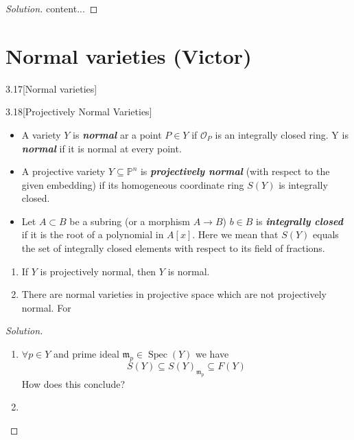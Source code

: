 \begin{proof}[Solution]
	content...
\end{proof}

\section{Normal varieties (Victor)}

\begin{manualexercise}{3.17}[Normal varieties]
	\end{manualexercise}

\begin{manualexercise}{3.18}[Projectively Normal Varieties]
\end{manualexercise}

	\begin{defn}\leavevmode 
		\begin{itemize}
		\item A variety $Y$ is \textit{\textbf{normal}} ar a point $P\in Y$ if $\mathcal{O}_{P}$ is an integrally closed ring. Y is \textit{\textbf{normal}} if it is normal at every point.
		\item A projective variety $Y\subseteq \mathbb{P}^n$ is \textit{\textbf{projectively normal}} (with respect to the given embedding) if its homogeneous coordinate ring $S(Y)$ is integrally closed.

		\item 	Let $A\subset B$ be a subring (or a morphism $A\to B$) $b\in B$ is \textit{\textbf{integrally closed}} if it is the root of a polynomial in $A[x]$. Here we mean that  $S(Y)$ equals the set of integrally closed elements with respect to its field of fractions.
\end{itemize}
	\end{defn}

	\begin{enumerate}[label=\alph*.]
		\item If $Y$ is projectively normal, then $Y$ is normal.

		\item There are normal varieties in projective space which are not projectively normal. For
	\end{enumerate}

\begin{proof}[Solution]\leavevmode
	\begin{enumerate}[label=\alph*.]
		\item $\forall p \in Y$ and prime ideal $\mathfrak{m}_p  \in\operatorname{Spec}(Y)$ we have
			\[S(Y)\subseteq S(Y)_{\mathfrak{m}_p}\subseteq F(Y)\]
			{\color{magenta}How does this conclude?}

		\item 
	\end{enumerate}
\end{proof}

